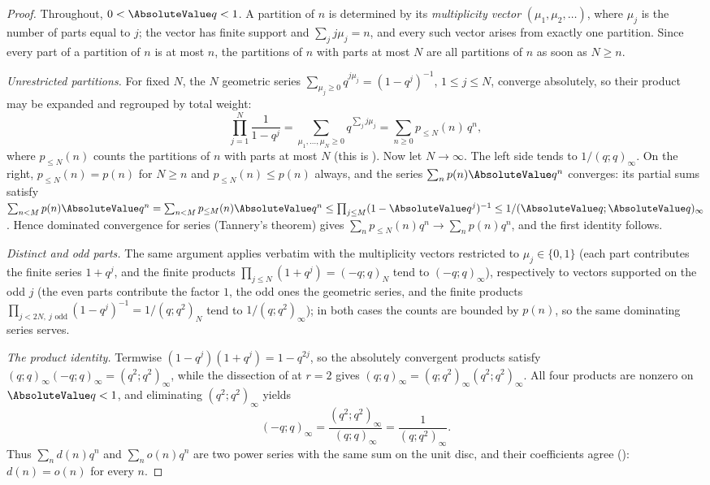 \documentclass[11pt,a4paper,oneside,openany]{book}
\theoremstyle{definition}
\theoremstyle{remark}
\begin{document}
\begin{proof}
Throughout, $0<\AbsoluteValue q<1$.  A partition of $n$ is determined by its
\emph{multiplicity vector} $(\mu_1,\mu_2,\dots)$, where $\mu_j$ is the number of
parts equal to $j$; the vector has finite support and $\sum_j j\mu_j=n$, and
every such vector arises from exactly one partition.  Since every part of a
partition of $n$ is at most $n$, the partitions of $n$ with parts at most $N$
are all partitions of $n$ as soon as $N\ge n$.

\emph{Unrestricted partitions.}  For fixed $N$, the $N$ geometric series
$\sum_{\mu_j\ge0}q^{j\mu_j}=(1-q^j)^{-1}$, $1\le j\le N$, converge absolutely,
so their product may be expanded and regrouped by total weight:
\[
 \prod_{j=1}^{N}\frac1{1-q^j}
 =\sum_{\mu_1,\dots,\mu_N\ge0}q^{\sum_j j\mu_j}
 =\sum_{n\ge0}p_{\le N}(n)\,q^n,
\]
where $p_{\le N}(n)$ counts the partitions of $n$ with parts at most $N$
(this is ).  Now let $N\to\infty$.  The left side
tends to $1/(q;q)_\infty$.  On the right, $p_{\le N}(n)=p(n)$ for $N\ge n$ and
$p_{\le N}(n)\le p(n)$ always, and the series $\sum_np(n)\AbsoluteValue q^n$
converges: its partial sums satisfy
$\sum_{n<M}p(n)\AbsoluteValue q^n=\sum_{n<M}p_{\le M}(n)\AbsoluteValue q^n
\le\prod_{j\le M}(1-\AbsoluteValue q^j)^{-1}\le1/(\AbsoluteValue q;\AbsoluteValue q)_\infty$.
Hence dominated convergence for series (Tannery's theorem) gives
$\sum_np_{\le N}(n)q^n\to\sum_np(n)q^n$, and the first identity follows.

\emph{Distinct and odd parts.}  The same argument applies verbatim with the
multiplicity vectors restricted to $\mu_j\in\{0,1\}$ (each part contributes the
finite series $1+q^j$, and the finite products
$\prod_{j\le N}(1+q^j)=(-q;q)_N$ tend to $(-q;q)_\infty$), respectively to
vectors supported on the odd $j$ (the even parts contribute the factor $1$,
the odd ones the geometric series, and the finite products
$\prod_{j<2N,\ j\text{ odd}}(1-q^j)^{-1}=1/(q;q^2)_N$ tend to
$1/(q;q^2)_\infty$); in both cases the counts are bounded by $p(n)$, so the
same dominating series serves.

\emph{The product identity.}  Termwise $(1-q^j)(1+q^j)=1-q^{2j}$, so the
absolutely convergent products satisfy $(q;q)_\infty(-q;q)_\infty=(q^2;q^2)_\infty$,
while the dissection of  at $r=2$ gives
$(q;q)_\infty=(q;q^2)_\infty(q^2;q^2)_\infty$.  All four products are nonzero on
$\AbsoluteValue q<1$, and eliminating $(q^2;q^2)_\infty$ yields
\[
 (-q;q)_\infty=\frac{(q^2;q^2)_\infty}{(q;q)_\infty}=\frac1{(q;q^2)_\infty}.
\]
Thus $\sum_nd(n)q^n$ and $\sum_no(n)q^n$ are two power series with the same
sum on the unit disc, and their coefficients agree
(): $d(n)=o(n)$ for every $n$.
\end{proof}
\end{document}
